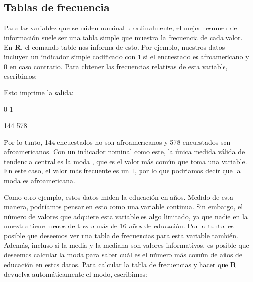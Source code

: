 \documentclass[
]{book}
\newenvironment{Shaded}{\begin{snugshade}}{\end{snugshade}}
\newcommand{\FunctionTok}[1]{\textcolor[rgb]{0.00,0.00,0.00}{#1}}
\newcommand{\NormalTok}[1]{#1}
\newcommand{\SpecialCharTok}[1]{\textcolor[rgb]{0.00,0.00,0.00}{#1}}
\begin{document}
\hypertarget{tablas-de-frecuencia}{%
\subsection*{Tablas de frecuencia}\label{tablas-de-frecuencia}}

Para las variables que se miden nominal u ordinalmente, el mejor resumen de información suele ser una tabla simple que muestra la frecuencia de cada valor. En \textbf{R}, el comando table nos informa de esto. Por ejemplo, nuestros datos incluyen un indicador simple codificado con 1 si el encuestado es afroamericano y 0 en caso contrario. Para obtener las frecuencias relativas de esta variable, escribimos:

\begin{Shaded}
\end{Shaded}

Esto imprime la salida:

0 1

144 578

Por lo tanto, 144 encuestados no son afroamericanos y 578 encuestados son afroamericanos. Con un indicador nominal como este, la única medida válida de tendencia central es la moda , que es el valor más común que toma una variable. En este caso, el valor más frecuente es un 1, por lo que podríamos decir que la moda es afroamericana.

Como otro ejemplo, estos datos miden la educación en años. Medido de esta manera, podríamos pensar en esto como una variable continua. Sin embargo, el número de valores que adquiere esta variable es algo limitado, ya que nadie en la muestra tiene menos de tres o más de 16 años de educación. Por lo tanto, es posible que deseemos ver una tabla de frecuencias para esta variable también. Además, incluso si la media y la mediana son valores informativos, es posible que deseemos calcular la moda para saber cuál es el número más común de años de educación en estos datos. Para calcular la tabla de frecuencias y hacer que \textbf{R} devuelva automáticamente el modo, escribimos:

\begin{Shaded}
\end{Shaded}
\end{document}
